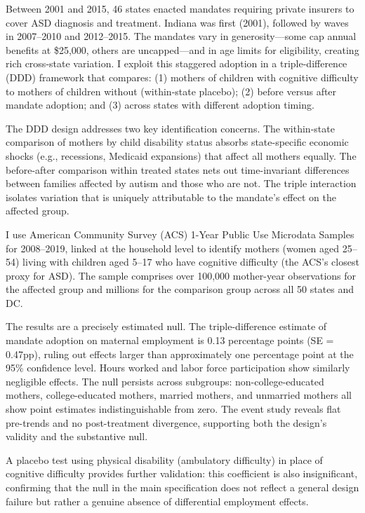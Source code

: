 \documentclass[12pt]{article}
\begin{document}
Between 2001 and 2015, 46 states enacted mandates requiring private insurers to cover ASD diagnosis and treatment. Indiana was first (2001), followed by waves in 2007--2010 and 2012--2015. The mandates vary in generosity---some cap annual benefits at \$25,000, others are uncapped---and in age limits for eligibility, creating rich cross-state variation. I exploit this staggered adoption in a triple-difference (DDD) framework that compares: (1) mothers of children with cognitive difficulty to mothers of children without (within-state placebo); (2) before versus after mandate adoption; and (3) across states with different adoption timing.

The DDD design addresses two key identification concerns. The within-state comparison of mothers by child disability status absorbs state-specific economic shocks (e.g., recessions, Medicaid expansions) that affect all mothers equally. The before-after comparison within treated states nets out time-invariant differences between families affected by autism and those who are not. The triple interaction isolates variation that is uniquely attributable to the mandate's effect on the affected group.

I use American Community Survey (ACS) 1-Year Public Use Microdata Samples for 2008--2019, linked at the household level to identify mothers (women aged 25--54) living with children aged 5--17 who have cognitive difficulty (the ACS's closest proxy for ASD). The sample comprises over 100,000 mother-year observations for the affected group and millions for the comparison group across all 50 states and DC.

The results are a precisely estimated null. The triple-difference estimate of mandate adoption on maternal employment is 0.13 percentage points (SE = 0.47pp), ruling out effects larger than approximately one percentage point at the 95\% confidence level. Hours worked and labor force participation show similarly negligible effects. The null persists across subgroups: non-college-educated mothers, college-educated mothers, married mothers, and unmarried mothers all show point estimates indistinguishable from zero. The event study reveals flat pre-trends and no post-treatment divergence, supporting both the design's validity and the substantive null.

A placebo test using physical disability (ambulatory difficulty) in place of cognitive difficulty provides further validation: this coefficient is also insignificant, confirming that the null in the main specification does not reflect a general design failure but rather a genuine absence of differential employment effects.
\end{document}
